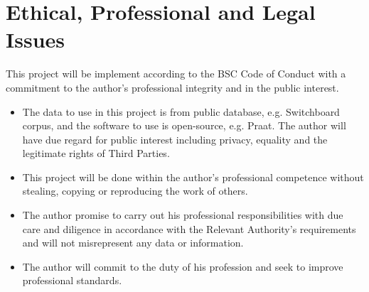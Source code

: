 \section{Ethical, Professional and Legal Issues}
This project will be implement according to the BSC Code of Conduct with a commitment to the author's professional integrity and in the public interest.

\begin{itemize}
    
    \item The data to use in this project is from public database, e.g. Switchboard corpus, and the software to use is open-source, e.g. Praat. The author will have due regard for public interest including privacy, equality and  the legitimate rights of Third Parties.
    
    \item This project will be done within the author's professional competence without stealing, copying or reproducing the work of others.
    
    \item The author promise to carry out his professional responsibilities with due care and
    diligence in accordance with the Relevant Authority’s requirements and will not misrepresent any data or information.
    
    \item The author will commit to the duty of his profession and seek to improve professional standards.
\end{itemize}



